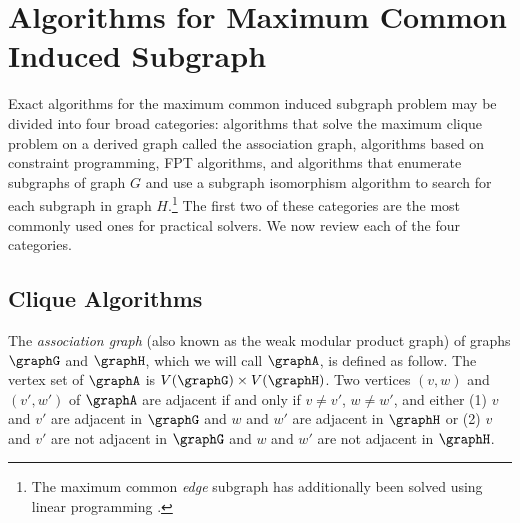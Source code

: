 
\section{Algorithms for Maximum Common Induced Subgraph}\label{sec:mcs-algorithms}


Exact algorithms for the maximum common induced subgraph problem may be divided
into four broad categories: algorithms that solve the maximum clique problem
on a derived graph called the association graph, algorithms based on constraint
programming, FPT algorithms, and algorithms that enumerate subgraphs of graph $G$ and use a
subgraph isomorphism algorithm to search for each subgraph in graph
$H$.\footnote{The maximum common \emph{edge} subgraph has additionally been
solved using linear programming
\citep{marenco1999algoritmo,DBLP:journals/dam/BahienseMPS12}.}
The first two of these categories are the most commonly used ones for
practical solvers.  We now review each of the four categories.

\subsection{Clique Algorithms}\label{subsec:clique-algorithms}

The \emph{association graph} (also known as the weak modular product graph)
of graphs $\graphG$ and $\graphH$, which we will call
$\graphA$, is defined as follow.  The vertex set of $\graphA$ is $V(\graphG)
\times V(\graphH)$.  Two vertices $(v,w)$ and $(v',w')$ of $\graphA$ are
adjacent if and only if $v \not= v'$, $w \not= w'$, and either (1) $v$ and $v'$
are adjacent in $\graphG$ and $w$ and $w'$ are adjacent in $\graphH$ or (2) $v$
and $v'$ are not adjacent in $\graphG$ and $w$ and $w'$ are not adjacent in
$\graphH$.

